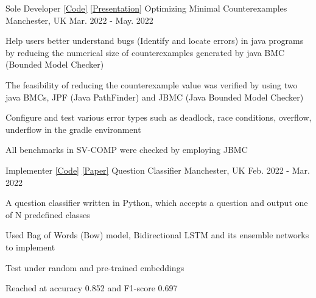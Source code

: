 \begin{cventries}

  \cventry
    {Sole Developer \href{https://github.com/Zhayu517/Software-Security-Seminar}{[Code]} \href{https://github.com/Zhayu517/Optimizing-minimal-counterexamples/blob/main/Seminar.pdf}{[Presentation]}} %
    {Optimizing Minimal Counterexamples} %
    {Manchester, UK} %
    {Mar. 2022 - May. 2022} %
    {
      \begin{cvitems} %
        \item {Help users better understand bugs (Identify and locate errors) in java programs by reducing the numerical size of counterexamples generated by java BMC (Bounded Model Checker)}
        \item {The feasibility of reducing the counterexample value was verified by using two java BMCs, JPF (Java PathFinder) and JBMC (Java Bounded Model Checker)}
        \item {Configure and test various error types such as deadlock, race conditions, overflow, underflow in the gradle environment}
        \item {All benchmarks in SV-COMP were checked by employing JBMC}
      \end{cvitems}
    }

  \cventry
    {Implementer \href{https://github.com/Zhayu517/Question-Classifier}{[Code]} \href{https://github.com/Zhayu517/Resume/blob/main/source/resume/Question\%20Classifier.pdf}{[Paper]}} %
    {Question Classifier} %
    {Manchester, UK} %
    {Feb. 2022 - Mar. 2022} %
    {
      \begin{cvitems} %
        \item {A question classifier written in Python, which accepts a question and output one of N            predefined classes}
        \item {Used Bag of Words (Bow) model, Bidirectional LSTM and its ensemble networks to implement}
        \item {Test under random and pre-trained embeddings}
        \item {Reached at accuracy 0.852 and F1-score 0.697}
      \end{cvitems}
    }


\end{cventries}
